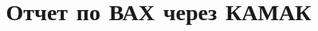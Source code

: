 \def\usetitle{}
\def\usegraphics{}



\title{Отчет по ВАХ через КАМАК}


	
	\ifdefined\usetitle
	    
	\fi
	
	

